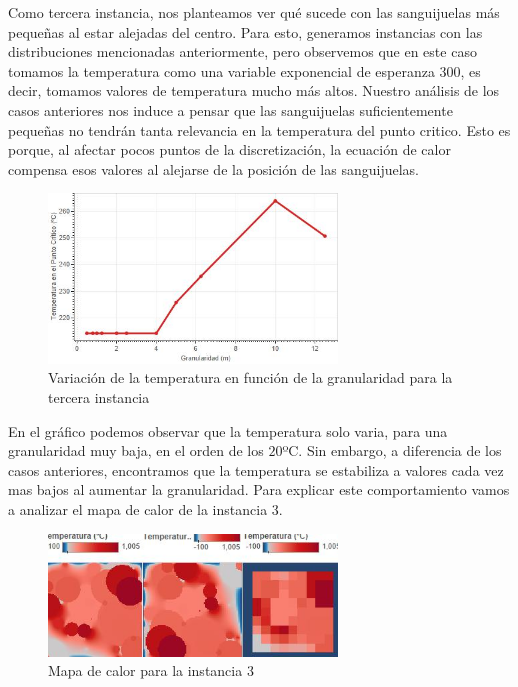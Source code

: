 Como tercera instancia, nos planteamos ver qué sucede con las sanguijuelas más pequeñas al estar alejadas del centro. Para esto, generamos instancias con las distribuciones mencionadas anteriormente, pero observemos que en este caso tomamos la temperatura como una variable exponencial de esperanza $300$, es decir, tomamos valores de temperatura mucho más altos. Nuestro análisis de los casos anteriores nos induce a pensar que las sanguijuelas suficientemente peque\~nas no tendrán tanta relevancia en la temperatura del punto critico. Esto es porque, al afectar pocos puntos de la discretizaci\'on, la ecuación de calor compensa esos valores al alejarse de la posición de las sanguijuelas. 

\begin{figure}[h]
    \centering
    \includegraphics[width=0.685\textwidth]{experimento 1-3}
    \caption{Variación de la temperatura en función de la granularidad para la tercera instancia}
    \label{fig:exp13}
\end{figure}

En el gráfico podemos observar que la temperatura solo varia, para una granularidad muy baja, en el orden de los $20$ºC. Sin embargo, a diferencia de los casos anteriores, encontramos que la temperatura se estabiliza a valores cada vez mas bajos al aumentar la granularidad. Para explicar este comportamiento vamos a analizar el mapa de calor de la instancia 3.

\begin{figure}[h]
    \centering
    \includegraphics[width=0.685\textwidth]{Ejemplo Instancia 3}
    \caption{Mapa de calor para la instancia 3}
    \label{fig:exp13-vis}
\end{figure}

